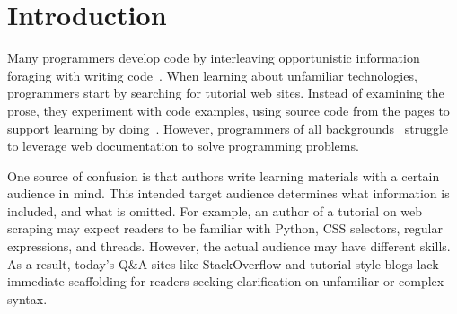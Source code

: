 \section{Introduction}

Many programmers develop code by interleaving opportunistic information foraging with writing code~\cite{brandt_two_2009,brandt_example-centric_2010}.
When learning about unfamiliar technologies, programmers start by searching for tutorial web sites.
Instead of examining the prose, they experiment with code examples, using source code from the pages to support learning by doing~\cite{brandt_two_2009}.
However, programmers of all backgrounds~\cite{duala-ekoko_asking_2012,dorn_lost_2013,dorn_learning_2010} struggle to leverage web documentation to solve programming problems.

One source of confusion is that authors write learning materials with a certain audience in mind.
This intended target audience determines what information is included, and what is omitted.
For example, an author of a tutorial on web scraping may expect readers to be familiar with Python, CSS selectors, regular expressions, and threads.
However, the actual audience may have different skills.
As a result, today's Q\&A sites like StackOverflow and tutorial-style blogs lack immediate scaffolding for readers seeking clarification on unfamiliar or complex syntax. 

